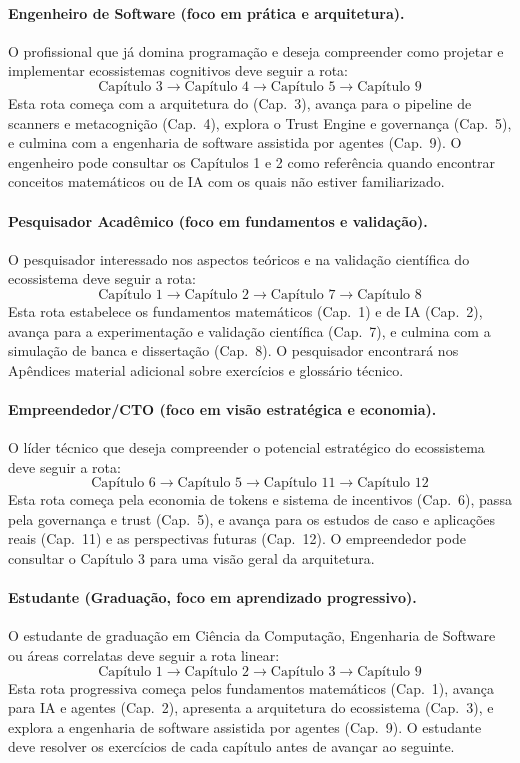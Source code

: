 \paragraph*{Engenheiro de Software (foco em prática e arquitetura).}
O profissional que já domina programação e deseja compreender como projetar
e implementar ecossistemas cognitivos deve seguir a rota:
\[
\text{Capítulo 3} \to \text{Capítulo 4} \to \text{Capítulo 5} \to
\text{Capítulo 9}
\]
Esta rota começa com a arquitetura do \opencodeeco{} (Cap.~3), avança para
o pipeline de scanners e metacognição (Cap.~4), explora o Trust Engine e
governança (Cap.~5), e culmina com a engenharia de software assistida por
agentes (Cap.~9). O engenheiro pode consultar os Capítulos 1 e 2 como
referência quando encontrar conceitos matemáticos ou de IA com os quais não
estiver familiarizado.

\paragraph*{Pesquisador Acadêmico (foco em fundamentos e validação).}
O pesquisador interessado nos aspectos teóricos e na validação científica do
ecossistema deve seguir a rota:
\[
\text{Capítulo 1} \to \text{Capítulo 2} \to \text{Capítulo 7} \to
\text{Capítulo 8}
\]
Esta rota estabelece os fundamentos matemáticos (Cap.~1) e de IA (Cap.~2),
avança para a experimentação e validação científica (Cap.~7), e culmina com
a simulação de banca e dissertação (Cap.~8). O pesquisador encontrará nos
Apêndices material adicional sobre exercícios e glossário técnico.

\paragraph*{Empreendedor/CTO (foco em visão estratégica e economia).}
O líder técnico que deseja compreender o potencial estratégico do ecossistema
deve seguir a rota:
\[
\text{Capítulo 6} \to \text{Capítulo 5} \to \text{Capítulo 11} \to
\text{Capítulo 12}
\]
Esta rota começa pela economia de tokens e sistema de incentivos (Cap.~6),
passa pela governança e trust (Cap.~5), e avança para os estudos de caso e
aplicações reais (Cap.~11) e as perspectivas futuras (Cap.~12). O
empreendedor pode consultar o Capítulo 3 para uma visão geral da arquitetura.

\paragraph*{Estudante (Graduação, foco em aprendizado progressivo).}
O estudante de graduação em Ciência da Computação, Engenharia de Software ou
áreas correlatas deve seguir a rota linear:
\[
\text{Capítulo 1} \to \text{Capítulo 2} \to \text{Capítulo 3} \to
\text{Capítulo 9}
\]
Esta rota progressiva começa pelos fundamentos matemáticos (Cap.~1), avança
para IA e agentes (Cap.~2), apresenta a arquitetura do ecossistema (Cap.~3),
e explora a engenharia de software assistida por agentes (Cap.~9). O
estudante deve resolver os exercícios de cada capítulo antes de avançar ao
seguinte.


